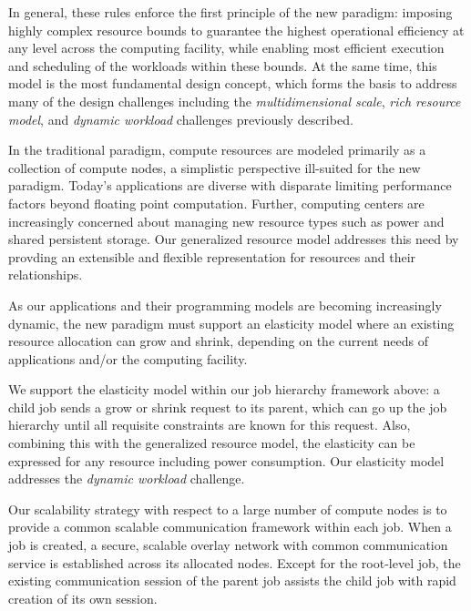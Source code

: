In general, these rules enforce the first principle 
of the new paradigm: imposing highly complex resource bounds 
to guarantee the highest operational efficiency 
at any level across the computing facility, while enabling 
most efficient execution and scheduling of the workloads 
within these bounds. 
At the same time, this model is the most fundamental 
design concept, which forms the basis to address 
many of the design challenges including 
the {\em multidimensional scale}, {\em rich resource model},
and {\em dynamic workload} challenges previously described.

\vspace{1ex}
 In the traditional 
paradigm, compute resources are modeled primarily 
as a collection of compute nodes, a simplistic perspective 
ill-suited for the new paradigm. Today's applications 
are diverse with disparate limiting performance factors 
beyond floating point computation. 
Further, computing centers are increasingly concerned 
about managing new resource types such as power 
and shared persistent storage. Our generalized resource
model addresses this need by provding an extensible
and flexible representation for resources
and their relationships.

\vspace{1ex}
 As our 
applications and their programming models are becoming 
increasingly dynamic, the new paradigm must support 
an elasticity model where an existing resource allocation 
can grow and shrink, depending on the current needs 
of applications and/or the computing facility. 

We support the elasticity model within our job hierarchy 
framework above: a child job sends a grow or shrink request 
to its parent, which can go up the job hierarchy 
until all requisite constraints are known for this request. 
Also, combining this with the generalized resource model, 
the elasticity can be expressed for any resource including 
power consumption. Our elasticity model addresses 
the {\em dynamic workload} challenge.

\vspace{1ex}
Our scalability strategy with respect to a large number 
of compute nodes is to provide a common scalable communication 
framework within each job. When a job is created, a secure, scalable 
overlay network with common communication service is established 
across its allocated nodes. Except for the root-level job, 
the existing communication session of the parent job assists 
the child job with rapid creation of its own session. 

